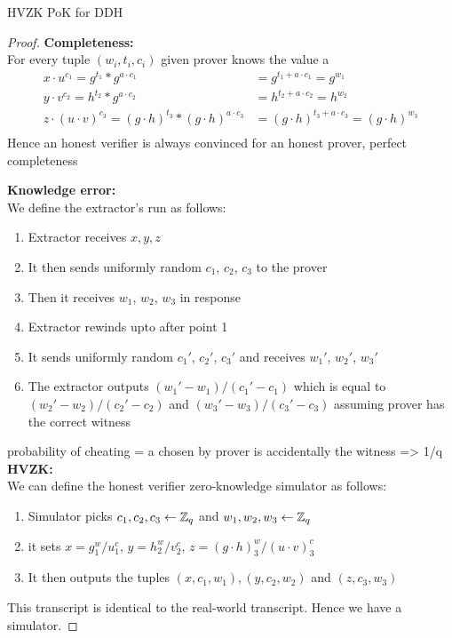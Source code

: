\begin{solution}{HVZK PoK for DDH}
\begin{proof}
    \textbf{Completeness:}\\
        For every tuple $(w_i,t_i,c_i)$ given prover knows the value a
        \begin{equation}
        \begin{split}
                x\cdot u^{c_1} = g^{t_1}*g^{a\cdot c_1} &= g^{t_1+a\cdot c_1} = g^{w_1}\\
                y\cdot v^{c_2} = h^{t_2}*g^{a\cdot c_2} &= h^{t_2+a\cdot c_2} = h^{w_2}\\
                z\cdot (u\cdot v)^{c_3} = (g\cdot h)^{t_3}*(g\cdot h)^{a\cdot c_3} &= (g\cdot h)^{t_3+a\cdot c_3} = (g\cdot h)^{w_3}\\   
        \end{split}
        \end{equation}
        Hence an honest verifier is always convinced for an honest prover, perfect completeness\\
    \newpage

    \textbf{Knowledge error:}\\
    We define the extractor's run as follows: 
    \begin{enumerate}
        \item Extractor receives $x,y,z$
        \item It then sends uniformly random $c_1$, $c_2$, $c_3$ to the prover
        \item Then it receives $w_1$, $w_2$, $w_3$ in response
        \item Extractor rewinds upto after point 1
        \item It sends uniformly random $c_1'$, $c_2'$, $c_3'$ and receives $w_1'$, $w_2'$, $w_3'$
        \item The extractor outputs $(w_1'-w_1)/(c_1'-c_1)$ which is equal to $(w_2'-w_2)/(c_2'-c_2)$ and $(w_3'-w_3)/(c_3'-c_3)$ assuming prover has the correct witness
    \end{enumerate}
    probability of cheating = a chosen by prover is accidentally the witness => 1/q\\

    \textbf{HVZK:}\\
    We can define the honest verifier zero-knowledge simulator as follows:
    \begin{enumerate}
        \item Simulator picks $c_1, c_2, c_3 \leftarrow \mathbb{Z}_q$ and $w_1, w_2, w_3 \leftarrow \mathbb{Z}_q$
        \item it sets $x = g^w_1/u^c_1$, $y = h^w_2/v^c_2$, $z = (g\cdot h)^w_3/(u\cdot v)^c_3$
        \item It then outputs the tuples $(x,c_1,w_1), (y,c_2,w_2)$ and $(z,c_3, w_3)$
    \end{enumerate}
    This transcript is identical to the real-world transcript. Hence we have a simulator.
    \end{proof}
\end{solution}
